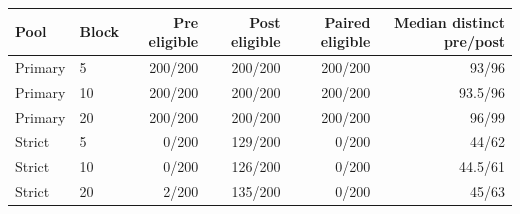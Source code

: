 \begin{tabular}{llrrrr}
\toprule
Pool & Block & Pre eligible & Post eligible & Paired eligible & Median distinct pre/post \\
\midrule
Primary & 5 & 200/200 & 200/200 & 200/200 & 93/96 \\
Primary & 10 & 200/200 & 200/200 & 200/200 & 93.5/96 \\
Primary & 20 & 200/200 & 200/200 & 200/200 & 96/99 \\
Strict & 5 & 0/200 & 129/200 & 0/200 & 44/62 \\
Strict & 10 & 0/200 & 126/200 & 0/200 & 44.5/61 \\
Strict & 20 & 2/200 & 135/200 & 0/200 & 45/63 \\
\bottomrule
\end{tabular}
